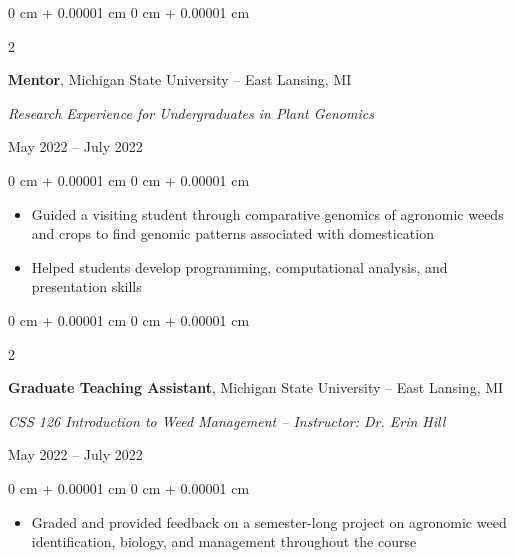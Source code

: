 \documentclass[10pt, letterpaper]{article}
\newenvironment{highlights}{
    \begin{itemize}[
        topsep=0.10 cm,
        parsep=0.10 cm,
        partopsep=0pt,
        itemsep=0pt,
        leftmargin=0 cm + 10pt
    ]
}{
    \end{itemize}
} %
\newenvironment{onecolentry}{
    \begin{adjustwidth}{
        0 cm + 0.00001 cm
    }{
        0 cm + 0.00001 cm
    }
}{
    \end{adjustwidth}
} %
\newenvironment{twocolentry}[2][]{
    \onecolentry
    \def\secondColumn{#2}
    \setcolumnwidth{\fill, 4.5 cm}
    \begin{paracol}{2}
}{
    \switchcolumn \raggedleft \secondColumn
    \end{paracol}
    \endonecolentry
} %
\begin{document}
        
        \vspace{0.2 cm}


        \begin{samepage} 
            \begin{twocolentry}{
                May 2022 – July 2022
                }
                \textbf{Mentor}, Michigan State University -- East Lansing, MI
                
                \vspace{0.05 cm}

                \textit{Research Experience for Undergraduates in Plant Genomics}
            \end{twocolentry}
        \end{samepage}    
        
        \vspace{0.10 cm}
        
        \begin{onecolentry}
            \begin{highlights}
                \item Guided a visiting student through comparative genomics of agronomic weeds and crops to find genomic patterns associated with domestication
                \item Helped students develop programming, computational analysis, and presentation skills
            \end{highlights}
        \end{onecolentry}        


        \vspace{0.2 cm}


        \begin{samepage} 
            \begin{twocolentry}{
                May 2022 – July 2022
                }
                \textbf{Graduate Teaching Assistant}, Michigan State University -- East Lansing, MI
                
                \vspace{0.05 cm}

                \textit{CSS 126 Introduction to Weed Management -- Instructor: Dr. Erin Hill}
            \end{twocolentry}
        \end{samepage}    
        
        \vspace{0.10 cm}
        
        \begin{onecolentry}
            \begin{highlights}
                \item Graded and provided feedback on a semester-long project on agronomic weed identification, biology, and management throughout the course
            \end{highlights}
        \end{onecolentry}  
\end{document}
